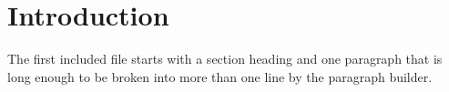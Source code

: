 \section{Introduction}
The first included file starts with a section heading and one paragraph
that is long enough to be broken into more than one line by the paragraph
builder.

